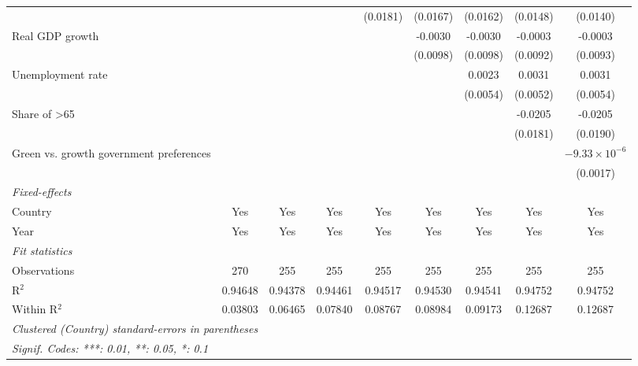\begin{table}[htbp]
\begin{tabular}{lcccccccc}
                                              &                 &                 &          & (0.0181) & (0.0167) & (0.0162) & (0.0148) & (0.0140)\\   
      Real GDP growth                         &                 &                 &          &          & -0.0030  & -0.0030  & -0.0003  & -0.0003\\   
                                              &                 &                 &          &          & (0.0098) & (0.0098) & (0.0092) & (0.0093)\\   
      Unemployment rate                       &                 &                 &          &          &          & 0.0023   & 0.0031   & 0.0031\\   
                                              &                 &                 &          &          &          & (0.0054) & (0.0052) & (0.0054)\\   
      Share of >65                            &                 &                 &          &          &          &          & -0.0205  & -0.0205\\   
                                              &                 &                 &          &          &          &          & (0.0181) & (0.0190)\\   
      Green vs. growth government preferences &                 &                 &          &          &          &          &          & $-9.33\times 10^{-6}$\\    
                                              &                 &                 &          &          &          &          &          & (0.0017)\\   
      \midrule
      \emph{Fixed-effects}\\
      Country                                 & Yes             & Yes             & Yes      & Yes      & Yes      & Yes      & Yes      & Yes\\  
      Year                                    & Yes             & Yes             & Yes      & Yes      & Yes      & Yes      & Yes      & Yes\\  
      \midrule
      \emph{Fit statistics}\\
      Observations                            & 270             & 255             & 255      & 255      & 255      & 255      & 255      & 255\\  
      R$^2$                                   & 0.94648         & 0.94378         & 0.94461  & 0.94517  & 0.94530  & 0.94541  & 0.94752  & 0.94752\\  
      Within R$^2$                            & 0.03803         & 0.06465         & 0.07840  & 0.08767  & 0.08984  & 0.09173  & 0.12687  & 0.12687\\  
      \midrule \midrule
      \multicolumn{9}{l}{\emph{Clustered (Country) standard-errors in parentheses}}\\
      \multicolumn{9}{l}{\emph{Signif. Codes: ***: 0.01, **: 0.05, *: 0.1}}\\
   \end{tabular}
\end{table}



